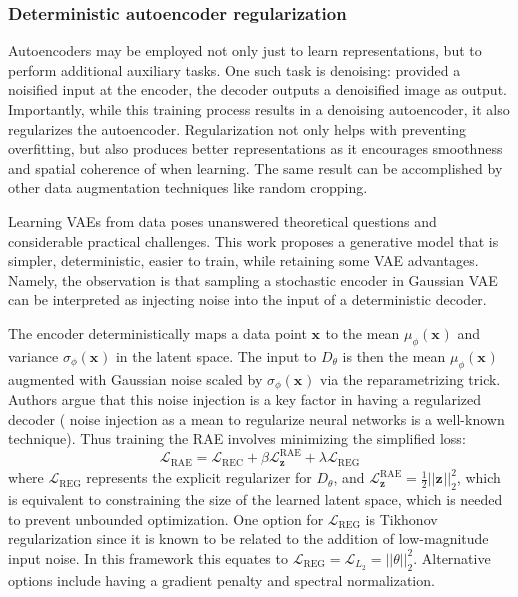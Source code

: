 \subsubsection{Deterministic autoencoder regularization}
\label{ae-regularization}
Autoencoders may be employed not only just to learn representations, 
but to perform additional auxiliary tasks.
One such task is denoising: provided a noisified input at the encoder,
the decoder outputs a denoisified image as output.
Importantly, while this training process results in a denoising autoencoder,
it also regularizes the autoencoder.
Regularization not only helps with preventing overfitting, but also
produces better representations as it encourages smoothness
and spatial coherence of when learning.
The same result can be accomplished by other data augmentation techniques
like random cropping.


Learning VAEs from data poses unanswered theoretical questions and considerable practical challenges.
This work proposes a generative model that is simpler, deterministic, easier to train,
while retaining some VAE advantages.
Namely, the observation is that sampling a stochastic encoder in Gaussian VAE can be interpreted as injecting
noise into the input of a deterministic decoder.

The encoder deterministically maps a data point $ \bm{x}_{}  $ to
the mean $ \mu_{ \phi } (\bm{x}_{})  $ and variance $ \sigma_{ \phi } ( \bm{x}_{})  $
in the latent space.
The input to $ D_{ \theta }  $ is then the mean $ \mu_{ \phi } (\bm{x}_{})  $
augmented with Gaussian noise scaled by $ \sigma_{ \phi } (\bm{x}_{})  $
via the reparametrizing trick.
Authors argue that this noise injection is a key factor in having a regularized decoder (
noise injection as a mean to regularize neural networks is a well-known technique).
Thus training the RAE involves minimizing the simplified loss:
\begin{equation}
		\mathcal{L}_{ \text{RAE} } = 
\mathcal{L}_{ \text{REC} } + \beta \mathcal{L}^{ \text{RAE} }_{ \bm{z}_{} } 
+ \lambda \mathcal{L}_{ \text{REG} }
\end{equation}
where $ \mathcal{L}_{ \text{REG} }  $ represents the explicit regularizer for $ D_{ \theta }  $,
and $ \mathcal{L}^{ \text{RAE} }_{ \bm{z}_{} } = \frac{1}{2} ||\bm{z}_{}||_{ 2 }^{ 2 }  $,
which is equivalent to constraining the size of the learned latent space, which is needed
to prevent unbounded optimization.
One option for $ \mathcal{L}_{ \text{REG} }  $ is Tikhonov regularization
since it is known to be related to the addition of low-magnitude input noise.
In this framework this equates to 
$ \mathcal{L}_{ \text{REG} } = \mathcal{L}_{ L_{ 2 } } = ||\theta||^{ 2 }_{ 2 } $.
Alternative options include having a gradient penalty and
spectral normalization.


